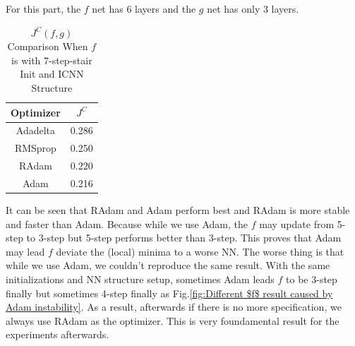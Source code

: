 \documentclass[conference,compsoc]{IEEEtran}
\begin{document}
For this part, the $f$ net has 6 layers  and the $g$ net has only 3 layers. 
\begin{table}[htbp]
  \caption{$J^{C}(f,g)$ Comparison When $f$ is with 7-step-stair Init and ICNN Structure }
  \begin{center}
  \begin{tabular}{|c|c|}
  \hline
  \textbf{Optimizer}& $J^{C}$ \\
  \hline

  Adadelta & 0.286\\
  RMSprop& 0.250 \\
  RAdam & 0.220\\
  Adam & 0.216\\
  \hline

\end{tabular}
  \label{tab1e results}
  \end{center}
  \end{table}
  
  It can be seen that RAdam and Adam perform best and RAdam is more stable and faster than Adam. Because while we use Adam, the $f$ may update from 5-step to 3-step but 5-step performs better than 3-step. This proves that Adam may lead $f$ deviate the (local) minima to a worse NN. The worse thing is that while we use Adam, we couldn't reproduce the same result. With the same initializations and NN structure setup, sometimes Adam leads $f$ to be 3-step finally but sometimes 4-step finally as Fig.\ref{fig:Different $f$ result caused by Adam instability}. As a result, afterwards if there is no more specification, we always use RAdam as the optimizer. This is very foundamental result for the experiments afterwards.\\
  
\end{document}
